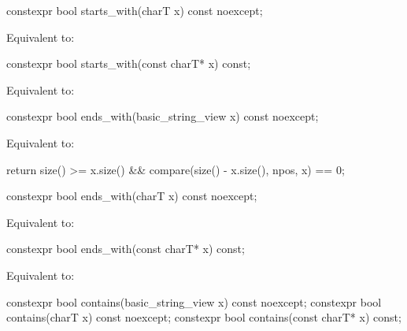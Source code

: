 %
\begin{itemdecl}
constexpr bool starts_with(charT x) const noexcept;
\end{itemdecl}

\begin{itemdescr}
\pnum
\effects
Equivalent to: 
\end{itemdescr}

%
\begin{itemdecl}
constexpr bool starts_with(const charT* x) const;
\end{itemdecl}

\begin{itemdescr}
\pnum
\effects
Equivalent to: 
\end{itemdescr}

%
\begin{itemdecl}
constexpr bool ends_with(basic_string_view x) const noexcept;
\end{itemdecl}

\begin{itemdescr}
\pnum
\effects
Equivalent to:
\begin{codeblock}
return size() >= x.size() && compare(size() - x.size(), npos, x) == 0;
\end{codeblock}
\end{itemdescr}

%
\begin{itemdecl}
constexpr bool ends_with(charT x) const noexcept;
\end{itemdecl}

\begin{itemdescr}
\pnum
\effects
Equivalent to: 
\end{itemdescr}

%
\begin{itemdecl}
constexpr bool ends_with(const charT* x) const;
\end{itemdecl}

\begin{itemdescr}
\pnum
\effects
Equivalent to: 
\end{itemdescr}

%
\begin{itemdecl}
constexpr bool contains(basic_string_view x) const noexcept;
constexpr bool contains(charT x) const noexcept;
constexpr bool contains(const charT* x) const;
\end{itemdecl}

